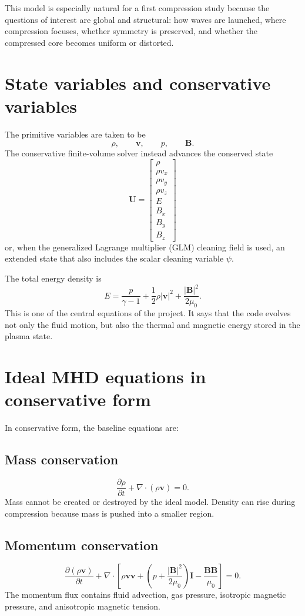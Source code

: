 \documentclass[11pt]{article}
\begin{document}
This model is especially natural for a first compression study because the questions of interest are global and structural: how waves are launched, where compression focuses, whether symmetry is preserved, and whether the compressed core becomes uniform or distorted.

\section{State variables and conservative variables}
The primitive variables are taken to be
\[
\rho,\qquad \mathbf{v},\qquad p,\qquad \mathbf{B}.
\]
The conservative finite-volume solver instead advances the conserved state
\[
\mathbf{U} = \begin{bmatrix}
\rho \\
\rho v_x \\
\rho v_y \\
\rho v_z \\
E \\
B_x \\
B_y \\
B_z
\end{bmatrix}
\]
or, when the generalized Lagrange multiplier (GLM) cleaning field is used, an extended state that also includes the scalar cleaning variable $\psi$.

The total energy density is
\[
E = \frac{p}{\gamma-1} + \frac{1}{2}\rho |\mathbf{v}|^2 + \frac{|\mathbf{B}|^2}{2\mu_0}.
\]
This is one of the central equations of the project. It says that the code evolves not only the fluid motion, but also the thermal and magnetic energy stored in the plasma state.

\section{Ideal MHD equations in conservative form}
In conservative form, the baseline equations are:

\subsection{Mass conservation}
\[
\frac{\partial \rho}{\partial t} + \nabla\cdot(\rho\mathbf{v}) = 0.
\]
Mass cannot be created or destroyed by the ideal model. Density can rise during compression because mass is pushed into a smaller region.

\subsection{Momentum conservation}
\[
\frac{\partial (\rho\mathbf{v})}{\partial t} + \nabla\cdot\left[\rho\mathbf{v}\mathbf{v} + \left(p + \frac{|\mathbf{B}|^2}{2\mu_0}\right)\mathbf{I} - \frac{\mathbf{B}\mathbf{B}}{\mu_0}\right] = 0.
\]
The momentum flux contains fluid advection, gas pressure, isotropic magnetic pressure, and anisotropic magnetic tension.
\end{document}
